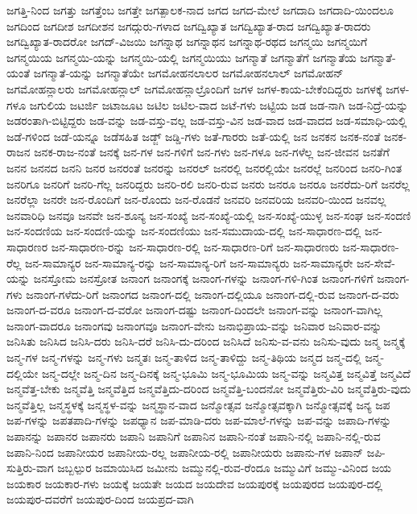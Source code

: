{ಜಗತ್ತಿ-ನಿಂದ
ಜಗತ್ತು
ಜಗತ್ತೆಂಬ
ಜಗತ್ತೇ
ಜಗತ್ಪಾಲಕ-ನಾದ
ಜಗದ
ಜಗದ-ಮೇಲೆ
ಜಗದಾದಿ
ಜಗದಾದಿ-ಯಿಂದಲೂ
ಜಗದಿಂದ
ಜಗದೀಶ
ಜಗದೀಶನ
ಜಗದ್ಗುರು-ಗಳಾದ
ಜಗದ್ವಿಖ್ಯಾತ
ಜಗದ್ವಿಖ್ಯಾತ-ರಾದ
ಜಗದ್ವಿಖ್ಯಾತ-ರಾದರು
ಜಗದ್ವಿಖ್ಯಾತ-ರಾದರೋ
ಜಗದ್-ವಿಜಯಿ
ಜಗನ್ನಾಥ
ಜಗನ್ನಾಥನ
ಜಗನ್ನಾಥ-ರಥದ
ಜಗನ್ಮಯಿ
ಜಗನ್ಮಯಿಗೆ
ಜಗನ್ಮಯಿಯ
ಜಗನ್ಮಯಿ-ಯನ್ನು
ಜಗನ್ಮಯಿ-ಯಲ್ಲಿ
ಜಗನ್ಮಯಿಯು
ಜಗನ್ಮಾತೆ
ಜಗನ್ಮಾತೆಗೆ
ಜಗನ್ಮಾತೆಯ
ಜಗನ್ಮಾತೆ-ಯಂತೆ
ಜಗನ್ಮಾತೆ-ಯನ್ನು
ಜಗನ್ಮಾತೆಯೇ
ಜಗಮೋಹನಲಾಲರ
ಜಗಮೋಹನಲಾಲ್
ಜಗಮೋಹನ್
ಜಗಮೋಹನ್ಲಾಲರು
ಜಗಮೋಹನ್ಲಾಲ್
ಜಗಮೋಹನ್ಲಾಲ್ರೊಂದಿಗೆ
ಜಗಳ
ಜಗಳ-ಕಾಯ-ಬೇಕೆಂದಿದ್ದರು
ಜಗಳಕ್ಕೆ
ಜಗಳ-ಗಳೂ
ಜಗುಲಿಯ
ಜಟರ್ಜಿ
ಜಟಾಜೂಟ
ಜಟಿಲ
ಜಟಿಲ-ವಾದ
ಜಟೆ-ಗಳು
ಜಟ್ಟಿಯ
ಜಡ
ಜಡ-ನಾಗಿ
ಜಡ-ನಿದ್ರೆ-ಯನ್ನು
ಜಡರಂತಾಗಿ-ಬಿಟ್ಟಿದ್ದರು
ಜಡ-ವನ್ನು
ಜಡ-ವಸ್ತು-ವಲ್ಲ
ಜಡ-ವಸ್ತು-ವಿನ
ಜಡ-ವಾದ
ಜಡ-ವಾದದ
ಜಡ-ಸಮಾಧಿ-ಯಲ್ಲಿ
ಜಡೆ-ಗಳಿಂದ
ಜಡೆ-ಯನ್ನೂ
ಜಡೆಸಹಿತ
ಜಡ್ಜ್
ಜಡ್ಡಿ-ಗಳು
ಜತೆ-ಗಾರರು
ಜತೆ-ಯಲ್ಲಿ
ಜನ
ಜನಕನ
ಜನಕ-ನಂತೆ
ಜನಕ-ರಾಜನ
ಜನಕ-ರಾಜ-ನಂತೆ
ಜನಕ್ಕೆ
ಜನ-ಗಳ
ಜನ-ಗಳಿಗೆ
ಜನ-ಗಳು
ಜನ-ಗಳೂ
ಜನ-ಗಳೆಲ್ಲ
ಜನ-ಜೀವನ
ಜನತೆಗೆ
ಜನನ
ಜನನದ
ಜನನಿ
ಜನರ
ಜನರಂತೆ
ಜನರನ್ನು
ಜನರಲ್
ಜನರಲ್ಲಿ
ಜನರಲ್ಲಿಯೇ
ಜನರಲ್ಲೆ
ಜನರಿಂದ
ಜನರಿ-ಗಿಂತ
ಜನರಿಗೂ
ಜನರಿಗೆ
ಜನರಿ-ಗೆಲ್ಲ
ಜನರಿದ್ದರು
ಜನರಿ-ರಲಿ
ಜನರಿ-ರುವ
ಜನರು
ಜನರೂ
ಜನರೂ
ಜನರೆದು-ರಿಗೆ
ಜನರೆಲ್ಲ
ಜನರೆಲ್ಲಾ
ಜನರೇ
ಜನ-ರೊಂದಿಗೆ
ಜನ-ರೊಂದು
ಜನ-ರೊಡನೆ
ಜನವರಿ
ಜನವರಿಯ
ಜನವರಿ-ಯಿಂದ
ಜನವಲ್ಲ
ಜನವಾರಿಧಿ
ಜನವೂ
ಜನವೇ
ಜನ-ಶೂನ್ಯ
ಜನ-ಸಂಖ್ಯೆ
ಜನ-ಸಂಖ್ಯೆ-ಯಲ್ಲಿ
ಜನ-ಸಂಖ್ಯೆ-ಯುಳ್ಳ
ಜನ-ಸಂಘ
ಜನ-ಸಂದಣಿ
ಜನ-ಸಂದಣಿಯ
ಜನ-ಸಂದಣಿ-ಯನ್ನು
ಜನ-ಸಂದಣಿಯು
ಜನ-ಸಮುದಾಯ-ದಲ್ಲಿ
ಜನ-ಸಾಧಾರಣ-ದಲ್ಲಿ
ಜನ-ಸಾಧಾರಣರ
ಜನ-ಸಾಧಾರಣ-ರನ್ನು
ಜನ-ಸಾಧಾರಣ-ರಲ್ಲಿ
ಜನ-ಸಾಧಾರಣ-ರಿಗೆ
ಜನ-ಸಾಧಾರಣರು
ಜನ-ಸಾಧಾರಣ-ರೆಲ್ಲ
ಜನ-ಸಾಮಾನ್ಯರ
ಜನ-ಸಾಮಾನ್ಯ-ರನ್ನು
ಜನ-ಸಾಮಾನ್ಯ-ರಿಗೆ
ಜನ-ಸಾಮಾನ್ಯರು
ಜನ-ಸಾಮಾನ್ಯರೇ
ಜನ-ಸೇವೆ-ಯನ್ನು
ಜನಸ್ತೋಮ
ಜನಸ್ರೋತ
ಜನಾಂಗ
ಜನಾಂಗಕ್ಕೆ
ಜನಾಂಗ-ಗಳನ್ನು
ಜನಾಂಗ-ಗಳಿ-ಗಿಂತ
ಜನಾಂಗ-ಗಳಿಗೆ
ಜನಾಂಗ-ಗಳು
ಜನಾಂಗ-ಗಳೆದು-ರಿಗೆ
ಜನಾಂಗದ
ಜನಾಂಗ-ದಲ್ಲಿ
ಜನಾಂಗ-ದಲ್ಲಿಯೂ
ಜನಾಂಗ-ದಲ್ಲಿ-ರುವ
ಜನಾಂಗ-ದ-ವರು
ಜನಾಂಗ-ದ-ವರೂ
ಜನಾಂಗ-ದ-ವರೋ
ಜನಾಂಗ-ದಷ್ಟು
ಜನಾಂಗ-ದಿಂದಲೇ
ಜನಾಂಗ-ವನ್ನು
ಜನಾಂಗ-ವಾಗಿಲ್ಲ
ಜನಾಂಗ-ವಾದರೂ
ಜನಾಂಗವು
ಜನಾಂಗವೂ
ಜನಾಂಗ-ವೇನು
ಜನಾಭಿಪ್ರಾಯ-ವನ್ನು
ಜನಿವಾರ
ಜನಿವಾರ-ವನ್ನು
ಜನಿಸಿತು
ಜನಿಸಿದ
ಜನಿಸಿ-ದರು
ಜನಿಸಿ-ದರೆ
ಜನಿಸಿ-ದು-ದರಿಂದ
ಜನಿಸಿದೆ
ಜನಿಸು-ವ-ವನು
ಜನಿಸು-ವುದು
ಜನ್ಮ
ಜನ್ಮಕ್ಕೆ
ಜನ್ಮ-ಗಳ
ಜನ್ಮ-ಗಳನ್ನು
ಜನ್ಮ-ಗಳು
ಜನ್ಮತಃ
ಜನ್ಮ-ತಾಳಿದ
ಜನ್ಮ-ತಾಳಿದ್ದು
ಜನ್ಮ-ತಿಥಿಯ
ಜನ್ಮದ
ಜನ್ಮ-ದಲ್ಲಿ
ಜನ್ಮ-ದಲ್ಲಿಯೇ
ಜನ್ಮ-ದಲ್ಲೇ
ಜನ್ಮ-ದಿನ
ಜನ್ಮ-ದಿನಕ್ಕೆ
ಜನ್ಮ-ಭೂಮಿ
ಜನ್ಮ-ಭೂಮಿಯ
ಜನ್ಮ-ವನ್ನು
ಜನ್ಮವಿತ್ತ
ಜನ್ಮವಿತ್ತೆ
ಜನ್ಮವಿದೆ
ಜನ್ಮವೆತ್ತ-ಬೇಕು
ಜನ್ಮವೆತ್ತಿ
ಜನ್ಮವೆತ್ತಿದ
ಜನ್ಮವೆತ್ತಿದು-ದರಿಂದ
ಜನ್ಮವೆತ್ತಿ-ಬಂದನೋ
ಜನ್ಮವೆತ್ತಿರು-ವಿರಿ
ಜನ್ಮವೆತ್ತಿರು-ವುದು
ಜನ್ಮವೆತ್ತಿಲ್ಲ
ಜನ್ಮಸ್ಥಳಕ್ಕೆ
ಜನ್ಮಸ್ಥಳ-ವನ್ನು
ಜನ್ಮಸ್ಥಾನ-ವಾದ
ಜನ್ಮೋತ್ಸವ
ಜನ್ಮೋತ್ಸವಕ್ಕಾಗಿ
ಜನ್ಮೋತ್ಸವಕ್ಕೆ
ಜನ್ಯ
ಜಪ
ಜಪ-ಗಳನ್ನು
ಜಪತಪಾದಿ-ಗಳನ್ನು
ಜಪಧ್ಯಾನ
ಜಪ-ಮಾಡಿ-ದರು
ಜಪ-ಮಾಲೆ-ಗಳನ್ನು
ಜಪ-ವನ್ನು
ಜಪಾದಿ-ಗಳನ್ನು
ಜಪಾನನ್ನು
ಜಪಾನರ
ಜಪಾನರು
ಜಪಾನಿ
ಜಪಾನಿಗೆ
ಜಪಾನಿನ
ಜಪಾನಿ-ನಂತೆ
ಜಪಾನಿ-ನಲ್ಲಿ
ಜಪಾನಿ-ನಲ್ಲಿ-ರುವ
ಜಪಾನಿ-ನಿಂದ
ಜಪಾನೀಯರ
ಜಪಾನೀಯ-ರಲ್ಲ
ಜಪಾನೀಯ-ರಲ್ಲಿ
ಜಪಾನೀಯರು
ಜಪಾನು-ಗಳ
ಜಪಾನ್
ಜಪಿ-ಸುತ್ತಿರು-ವಾಗ
ಜಬ್ಬಲ್ಪುರ
ಜಮಾಯಿಸಿದ
ಜಮೀನು
ಜಮ್ಮುನಲ್ಲಿ-ರುವ-ರೆಂದೂ
ಜಮ್ಮುವಿಗೆ
ಜಮ್ಮು-ವಿನಿಂದ
ಜಯ
ಜಯಕಾರ
ಜಯಕಾರ-ಗಳು
ಜಯಕ್ಕೆ
ಜಯತೇ
ಜಯದ
ಜಯದೇವ
ಜಯಪುರಕ್ಕೆ
ಜಯಪುರದ
ಜಯಪುರ-ದಲ್ಲಿ
ಜಯಪುರ-ದವರೆಗೆ
ಜಯಪುರ-ದಿಂದ
ಜಯಪ್ರದ-ವಾಗಿ
}
